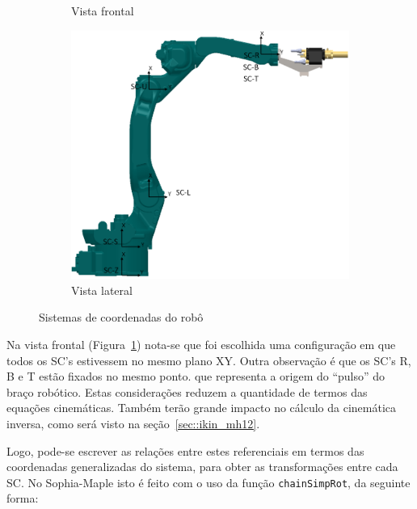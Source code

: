 \begin{figure}[h]
\begin{subfigure}[b]{0.20\textwidth}
        \caption{Vista frontal}
        \label{fig::sc_front}
    \end{subfigure}
    \quad %
    \begin{subfigure}[b]{0.7\textwidth}
        \includegraphics[width=\textwidth]{figs/sc_lat}
        \caption{Vista lateral}
        \label{fig::sc_lat}
    \end{subfigure}
    \caption{Sistemas de coordenadas do robô}\label{fig::scs}
\end{figure}

Na vista frontal (Figura~\ref{fig::sc_front}) nota-se que foi escolhida uma
configuração em que todos os SC's estivessem no mesmo plano XY. Outra observação
é que os SC's R, B e T estão fixados no mesmo ponto. que representa a origem do
``pulso'' do braço robótico. Estas considerações reduzem a quantidade de termos
das equações cinemáticas. Também terão grande impacto no cálculo da cinemática
inversa, como será visto na seção~\ref{sec::ikin_mh12}.

Logo, pode-se escrever as relações entre estes referenciais em termos das
coordenadas generalizadas do sistema, para obter as transformações entre cada
SC. No Sophia-Maple isto é feito com o uso da função \texttt{chainSimpRot}, da
seguinte forma:

\medskip {} \medskip 

